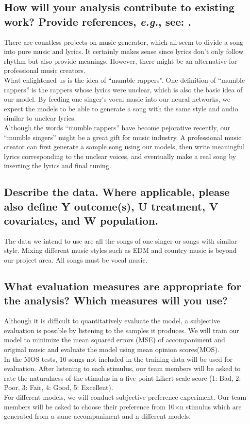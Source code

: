 \documentclass[twoside,11pt]{article}
\begin{document}
\subsection{How will your analysis contribute to existing work? Provide references, \emph{e.g.}, see: \cite{cite1}.}
There are countless projects on music generator, which all seem to divide a song into pure music and lyrics. It certainly makes sense since lyrics don’t only follow rhythm but also provide meanings. However, there might be an alternative for professional music creators.\\
What enlightened us is the idea of “mumble rappers”. One definition of “mumble rappers” is the rappers whose lyrics were unclear, which is also the basic idea of our model. By feeding one singer’s vocal music into our neural networks, we expect the models to be able to generate a song with the same style and audio similar to unclear lyrics.\\ 
Although the words “mumble rappers” have become pejorative recently, our “mumble singers” might be a great gift for music industry. A professional music creator can first generate a sample song using our models, then write meaningful lyrics corresponding to the unclear voices, and eventually make a real song by inserting the lyrics and final tuning. 

\subsection{Describe the data. Where applicable, please also define Y outcome(s), U treatment, V covariates, and W population.}
The data we intend to use are all the songs of one singer or songs with similar style. Mixing different music styles such as EDM and country music is beyond our project area. All songs must be vocal music.


\subsection{What evaluation measures are appropriate for the analysis? Which measures will you use?}
Although it is difficult to quantitatively evaluate the model, a subjective evaluation is possible by listening to the samples it produces. We will train our model to minimize the mean squared errors (MSE) of accompaniment and original music and evaluate the model using mean opinion scores(MOS).\\
In the MOS tests, 10 songs not included in the training data will be used for evaluation. After listening to each stimulus, our team members will be asked to rate the naturalness of the stimulus in a five-point Likert scale score (1: Bad, 2: Poor, 3: Fair, 4: Good, 5: Excellent).\\
For different models, we will conduct subjective preference experiment. Our team members will be asked to choose their preference from 10×n stimulus which are generated from a same accompaniment and n different models.
\end{document}
